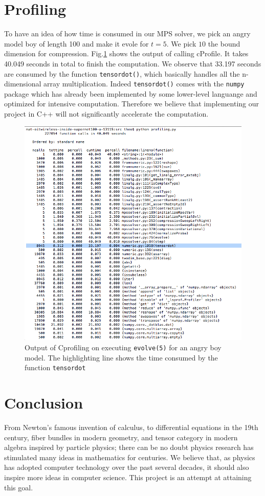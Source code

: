 \documentclass[english]{article}[12pt]
\begin{document}
\section{Profiling}
To have an idea of how time is consumed in our MPS solver, we pick an angry model boy of length 100 and make it evole for $t=5$. We pick $10$ the bound dimension for compression. Fig.\ref{fig:prof} shows the output of calling cProfile. It takes 40.049 seconds in total to finish the computation. We observe that 33.197 seconds are consumed by the function \texttt{tensordot()}, which basically handles all the n-dimensional array multiplication. Indeed \texttt{tensordot()} comes with the \texttt{numpy} package which has already been implemented by some lower-level languange and optimized for intensive computation. Therefore we believe that implementing our project in C++ will not significantly accelerate the computation. 
\begin{figure}[H]
\centering
\includegraphics[scale=0.4]{Result_Fig/profiling.png}
\caption{Output of Cprofiling on executing \texttt{evolve(5)} for an angry boy model. The highlighting line shows the time consumed by the function \texttt{tensordot}}
\label{fig:prof}
\end{figure} 

\section{Conclusion}
From Newton's famous invention of calculus, to differential equations in the 19th century, fiber bundles in modern geometry, and tensor category in modern algebra inspired by particle physics; there can be no doubt physics research has stimulated many ideas in mathematics for centuries. We believe that, as physics has adopted computer technology over the past several decades, it should also inspire more ideas in computer science. This project is an attempt at attaining this goal.
\end{document}
